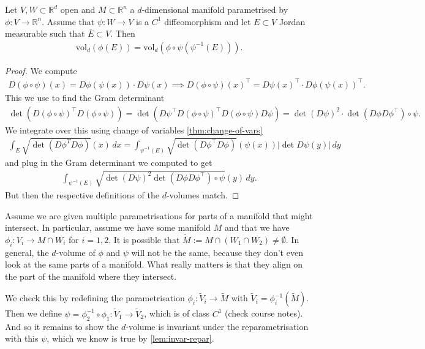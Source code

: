 \begin{lemma}\label{lem:invar-repar}
	Let $V, W \subset \mathbb{R}^{d}$ open and $M \subset \mathbb{R}^{n}$ a $d$-dimensional manifold parametrised by $\phi: V \to \mathbb{R}^{n}$. Assume that $\psi: W \to V$ is a $C^{1}$ diffeomorphism and let $E \subset V$ Jordan measurable such that $\overline{ E } \subset V$. Then
	\begin{align*}
		\text{vol}_{d}(\phi(E)) = \text{vol}_{d}(\phi \circ \psi( \psi^{-1}(E) )).
	\end{align*}
\end{lemma}
\begin{proof}
	We compute
	\begin{align*}
		D(\phi \circ \psi)(x) = D\phi(\psi(x)) \cdot D\psi(x) \implies D(\phi \circ \psi)(x)^\top = D\psi(x)^\top \cdot D \phi(\psi(x))^\top.
	\end{align*}
	This we use to find the Gram determinant
	\begin{align*}
		\det (D(\phi \circ \psi)^\top D(\phi \circ \psi)) = \det (D \psi^\top D(\phi \circ \psi)^\top D(\phi \circ \psi) D\psi) = \det (D \psi)^{2} \cdot \det (D\phi D\phi^\top) \circ \psi.
	\end{align*}
	We integrate over this using change of variables \ref{thm:change-of-vars}
	\begin{align*}
		\int_{E} \sqrt{\det (D \phi^{T} D \phi)}(x) \, dx = \int_{\psi^{-1}(E)} \sqrt{\det (D\phi^\top D\phi)}(\psi(x)) \left| \det D \psi(y) \right| \, dy
	\end{align*}
	and plug in the Gram determinant we computed to get
	\begin{align*}
		\int_{\psi^{-1}(E)} \sqrt{ \det (D \psi)^{2}\det (D\phi D\phi^\top) \circ \psi }(y)  \, dy.
	\end{align*}
	But then the respective definitions of the $d$-volumes match.
\end{proof}

\begin{remark}
	Assume we are given multiple parametrisations for parts of a manifold that might intersect. In particular, assume we have some manifold $M$ and that we have $\phi_{i}: V_{i} \to M \cap W_{i}$ for $i = 1,2$. It is possible that $\widetilde{M} := M \cap (W_{1} \cap W_{2}) \neq \emptyset$. In general, the $d$-volume of $\phi$ and $\psi$ will not be the same, because they don't even look at the same parts of a manifold. What really matters is that they align on the part of the manifold where they intersect.

	We check this by redefining the parametrisation $\phi_{i}: \widetilde{V}_{i} \to \widetilde{M}$ with $\widetilde{V}_{i} = \phi_{i}^{-1}(\widetilde{M})$. Then we define $\psi = \phi_{2}^{-1} \circ \phi_{1}: \widetilde{V}_{1} \to \widetilde{V}_{2}$, which is of class $C^{1}$ (check course notes). And so it remains to show the $d$-volume is invariant under the reparametrisation with this $\psi$, which we know is true by \ref{lem:invar-repar}.
\end{remark}

